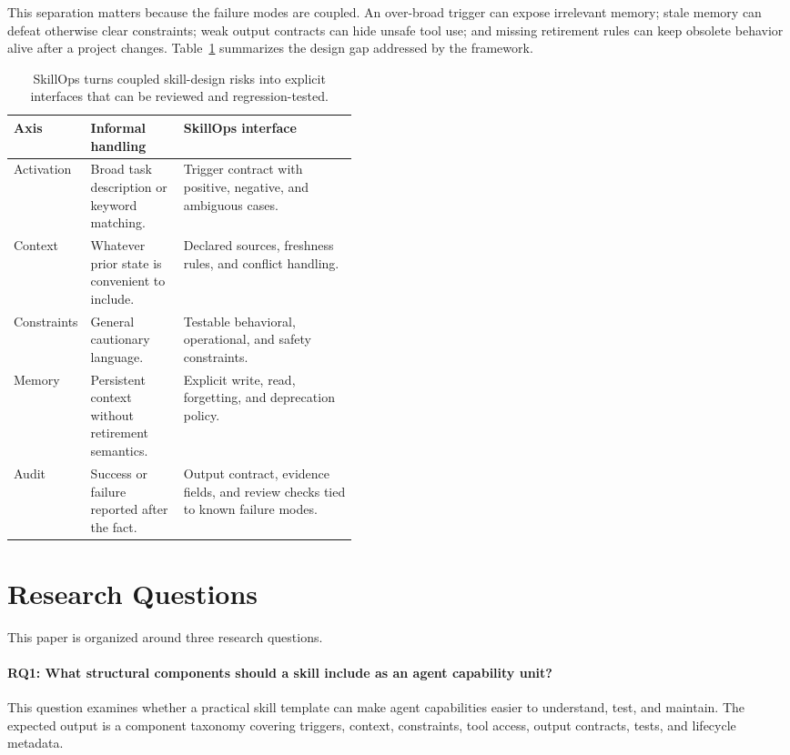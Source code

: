 \documentclass[11pt]{article}
\begin{document}
This separation matters because the failure modes are coupled. An over-broad
trigger can expose irrelevant memory; stale memory can defeat otherwise clear
constraints; weak output contracts can hide unsafe tool use; and missing
retirement rules can keep obsolete behavior alive after a project changes.
Table~\ref{tab:design-gap} summarizes the design gap addressed by the
framework.

\begin{table}[t]
\centering
\footnotesize
\begin{tabularx}{\linewidth}{
    >{\raggedright\arraybackslash}p{0.17\linewidth}
    >{\raggedright\arraybackslash}p{0.27\linewidth}
    >{\raggedright\arraybackslash}X
}
\toprule
\textbf{Axis} & \textbf{Informal handling} & \textbf{SkillOps interface} \\
\midrule
Activation & Broad task description or keyword matching. & Trigger contract
with positive, negative, and ambiguous cases. \\
Context & Whatever prior state is convenient to include. & Declared sources,
freshness rules, and conflict handling. \\
Constraints & General cautionary language. & Testable behavioral,
operational, and safety constraints. \\
Memory & Persistent context without retirement semantics. & Explicit write,
read, forgetting, and deprecation policy. \\
Audit & Success or failure reported after the fact. & Output contract,
evidence fields, and review checks tied to known failure modes. \\
\bottomrule
\end{tabularx}
\caption{SkillOps turns coupled skill-design risks into explicit interfaces
that can be reviewed and regression-tested.}
\label{tab:design-gap}
\end{table}

\section{Research Questions}

This paper is organized around three research questions.

\paragraph{RQ1: What structural components should a skill include as an agent capability unit?}

This question examines whether a practical skill template can make agent
capabilities easier to understand, test, and maintain. The expected output is a
component taxonomy covering triggers, context, constraints, tool access, output
contracts, tests, and lifecycle metadata.
\end{document}
